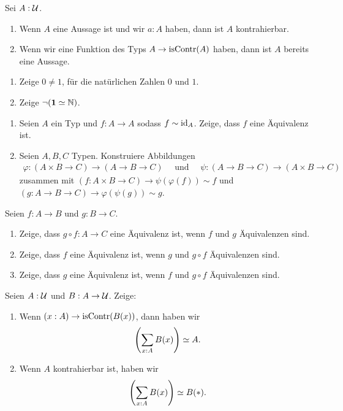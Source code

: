 \documentclass{hott-übung}
\begin{document}
\setcounter{blattnummer}{3}
\setcounter{aufgabennummer}{0}

\blatt

\aufgabe{}
Sei $A:\mathcal{U}$.
\begin{enumerate}
\item Wenn $A$ eine Aussage ist und wir $a:A$ haben, dann ist $A$ kontrahierbar.
\item Wenn wir eine Funktion des Typs $A\to \mathrm{isContr}(A)$ haben, dann ist $A$ bereits eine Aussage. 
\end{enumerate}

\aufgabe{}
\begin{enumerate}
\item Zeige $0\neq 1$, für die natürlichen Zahlen $0$ und $1$.  
\item Zeige $\neg(\mathbf{1}\simeq \mathbb{N})$.
\end{enumerate}

\aufgabe{}
\begin{enumerate}
\item Seien $A$ ein Typ und $f:A\to A$ sodass $f\sim \mathrm{id}_A$. Zeige, dass $f$ eine Äquivalenz ist.
\item Seien $A,B,C$ Typen.
Konstruiere Abbildungen
\begin{align*}
\varphi : (A\times B \to C)\to (A\to B\to C)\quad\text{ und }  \quad\psi:(A\to B\to C)\to (A\times B\to C)
\end{align*}
zusammen mit $(f:A\times B \to C)\to \psi(\varphi(f))\sim f$ und $(g:A\to B\to C)\to \varphi(\psi(g))\sim g$.
\end{enumerate}

Seien $f:A\to B$ und $g:B\to C$.
\begin{enumerate}
\item Zeige, dass $g\circ f:A\to C$ eine Äquivalenz ist, wenn $f$ und $g$ Äquivalenzen sind.
\item Zeige, dass $f$ eine Äquivalenz ist, wenn $g$ und $g\circ f$ Äquivalenzen sind.
\item Zeige, dass $g$ eine Äquivalenz ist, wenn $f$ und $g\circ f$ Äquivalenzen sind.
\end{enumerate}

\bonus{}
Seien $A:\mathcal{U}$ und $B:A\to\mathcal{U}$. Zeige:
\begin{enumerate}
\item Wenn $(x:A)\to \mathrm{isContr}(B(x))$, dann haben wir
  \[
    \left(\sum_{x:A}B(x)\right)\simeq A\rlap{.}
  \]
\item Wenn $A$ kontrahierbar ist, haben wir
  \[
    \left(\sum_{x:A}B(x)\right)\simeq B(\ast)\rlap{.}
  \]
\end{enumerate}
\end{document}
